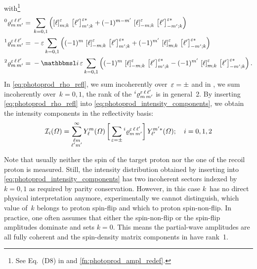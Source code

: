 with\footnote{See Eq.~(D8) in  and
\cref{fn:photoprod_ampl_redef}.}
\begin{align}
  \label{eq:photoprod_rho_0_refl}
  \prescript{0}{}{\varrho}^{\refl\, \ell\, \ell'}_{m\, m'}
  ={}& \sum_{k = 0, 1} \rBrk[2]{\sBrk{\ell}^\refl_{m; k}\, \sBrk{\ell'}^{\refl *}_{m'; k}
  + (-1)^{m - m'}\, \sBrk{\ell}^\refl_{{-m}; k}\, \sBrk{\ell'}^{\refl *}_{{-m'}; k}}
  \\
  \label{eq:photoprod_rho_1_refl}
  \prescript{1}{}{\varrho}^{\refl\, \ell\, \ell'}_{m\, m'}
  ={}& -\refl \sum_{k = 0, 1}
  \rBrk[2]{(-1)^m\, \sBrk{\ell}^\refl_{{-m}; k}\, \sBrk{\ell'}^{\refl *}_{m'; k}
  + (-1)^{m'}\, \sBrk{\ell}^\refl_{m; k}\, \sBrk{\ell'}^{\refl *}_{{-m'}; k}}
  \\
  \label{eq:photoprod_rho_2_refl}
  \prescript{2}{}{\varrho}^{\refl\, \ell\, \ell'}_{m\, m'}
  ={}& -\imag\, \refl \sum_{k = 0, 1}
  \rBrk[2]{(-1)^m\, \sBrk{\ell}^\refl_{{-m}; k}\, \sBrk{\ell'}^{\refl *}_{m'; k}
  - (-1)^{m'}\, \sBrk{\ell}^\refl_{m; k}\, \sBrk{\ell'}^{\refl *}_{{-m'}; k}}.
\end{align}
In \cref{eq:photoprod_rho_refl}, we sum incoherently over~$\varepsilon =
\pm$ and in
, we sum
incoherently over~$k = 0, 1$, \ie the rank of the
$\prescript{i}{}{\varrho}^{\varepsilon\, \ell\, \ell'}_{m\, m'}$ is in
general~2.  By inserting \cref{eq:photoprod_rho_refl} into
\cref{eq:photoprod_intensity_components}, we obtain the intensity
components in the reflectivity basis:
\begin{equation}
  \label{eq:photoprod_intensity_components_refl}
  \intensity_i(\Omega)
  = \sum_{\substack{\ell m \\ \ell' m'}}^\infty
  Y_\ell^m(\Omega)
  \sBrk[3]{\, \sum_{\refl = \pm} \prescript{i}{}{\varrho}^{\refl\, \ell\, \ell'}_{m\, m'}}
  Y_{\ell'}^{m' *}(\Omega);
  \quad i = 0, 1, 2
\end{equation}

Note that usually neither the spin of the target proton
nor the one of the recoil proton is measured.  Still, the intensity
distribution obtained by inserting
 into
\cref{eq:photoprod_intensity_components} has two incoherent sectors
indexed by~$k = 0, 1$ as required by parity conservation.  However, in
this case $k$~has no direct physical interpretation anymore, \ie
experimentally we cannot distinguish, which value of~$k$ belongs to
proton spin-flip and which to proton spin-non-flip.  In practice, one
often assumes that either the spin-non-flip or the spin-flip
amplitudes dominate and sets $k = 0$.  This means the partial-wave
amplitudes are all fully coherent and the spin-density matrix
components in
 have
rank~1.


